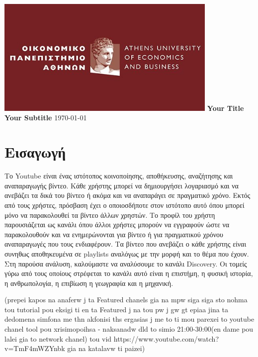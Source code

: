 \documentclass[12pt]{article}
\begin{document}
	
	\begin{titlepage}
		\centering
		\includegraphics[width=0.8\textwidth]{aueb_logo.jpg}
		\vfill
		\Huge\textbf{Your Title}
		\vspace{1cm}
		\Large\textbf{Your Subtitle}
		\vfill
		\today
	\end{titlepage}
	
	\renewcommand{\contentsname}{Περιεχόμενα}
	\tableofcontents
	
	\newpage  %
	
	\section{Εισαγωγή}
	Το Youtube είναι ένας ιστότοπος κοινοποίησης, αποθήκευσης, αναζήτησης και αναπαραγωγής βίντεο. Κάθε χρήστης μπορεί να δημιουργήσει λογαριασμό και να ανεβάζει τα δικά του βίντεο ή ακόμα και να αναπαράγει σε πραγματικό χρόνο. Εκτός από τους χρήστες, πρόσβαση έχει ο οποιοσδήποτε στον ιστότοπο αυτό όπου μπορεί μόνο να παρακολουθεί τα βίντεο άλλων χρηστών. Το προφίλ του χρήστη παρουσιάζεται ως κανάλι όπου άλλοι χρήστες μπορούν να εγγραφούν ώστε να παρακολουθούν και να ενημερώνονται για βίντεο ή για πραγματικού χρόνου αναπαραγωγές που τους ενδιαφέρουν. Τα βίντεο που ανεβάζει ο κάθε χρήστης είναι συνηθως αποθηκευμένα σε playlists αναλόγως με την μορφή και το θέμα που έχουν. Στη παρούσα ανάλυση, καλούμαστε να αναλύσουμε το κανάλι Discovery. Οι τομείς γύρω από τους οποίους στρέφεται το κανάλι αυτό είναι η επιστήμη, η φυσική ιστορία, η ανθρωπολογία, η επιβίωση η γεωγραφία και η μηχανική.
	
	(prepei kapos na anaferw j ta Featured chanels gia na mpw siga siga sto nohma tou tutorial pou eksigi ti en ta Featured j na tou pw j gw gt epiaa jina ta dedomena simfona me thn akfonisi ths ergasias j me to ti mou parexei to youtube chanel tool pou xrisimopoihsa
	- naksanadw dld to simio 21:00-30:00(en dame pou lalei gia to network chanel) tou vid https://www.youtube.com/watch?v=TmF4mWZYnbk gia na katalavw ti paizei)
	
\end{document}
